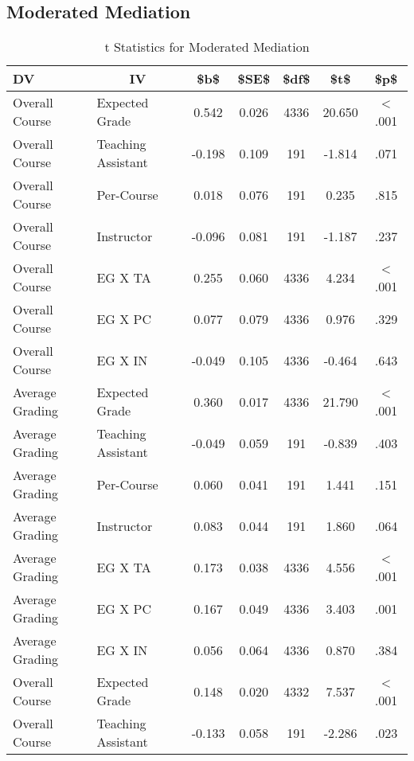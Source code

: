 \documentclass[man]{apa6}
\theoremstyle{definition}
\theoremstyle{definition}
\theoremstyle{definition}
\theoremstyle{remark}
\begin{document}
\hypertarget{moderated-mediation}{%
\subsection{Moderated Mediation}\label{moderated-mediation}}

\begin{table}[tbp]
\begin{center}
\begin{threeparttable}
\caption{\label{tab:table-mod-med}t Statistics for Moderated Mediation}
\begin{tabular}{llccccc}
\toprule
DV & \multicolumn{1}{c}{IV} & \multicolumn{1}{c}{\$b\$} & \multicolumn{1}{c}{\$SE\$} & \multicolumn{1}{c}{\$df\$} & \multicolumn{1}{c}{\$t\$} & \multicolumn{1}{c}{\$p\$}\\
\midrule
Overall Course & Expected Grade & 0.542 & 0.026 & 4336 & 20.650 & < .001\\
Overall Course & Teaching Assistant & -0.198 & 0.109 & 191 & -1.814 & .071\\
Overall Course & Per-Course & 0.018 & 0.076 & 191 & 0.235 & .815\\
Overall Course & Instructor & -0.096 & 0.081 & 191 & -1.187 & .237\\
Overall Course & EG X TA & 0.255 & 0.060 & 4336 & 4.234 & < .001\\
Overall Course & EG X PC & 0.077 & 0.079 & 4336 & 0.976 & .329\\
Overall Course & EG X IN & -0.049 & 0.105 & 4336 & -0.464 & .643\\
Average Grading & Expected Grade & 0.360 & 0.017 & 4336 & 21.790 & < .001\\
Average Grading & Teaching Assistant & -0.049 & 0.059 & 191 & -0.839 & .403\\
Average Grading & Per-Course & 0.060 & 0.041 & 191 & 1.441 & .151\\
Average Grading & Instructor & 0.083 & 0.044 & 191 & 1.860 & .064\\
Average Grading & EG X TA & 0.173 & 0.038 & 4336 & 4.556 & < .001\\
Average Grading & EG X PC & 0.167 & 0.049 & 4336 & 3.403 & .001\\
Average Grading & EG X IN & 0.056 & 0.064 & 4336 & 0.870 & .384\\
Overall Course & Expected Grade & 0.148 & 0.020 & 4332 & 7.537 & < .001\\
Overall Course & Teaching Assistant & -0.133 & 0.058 & 191 & -2.286 & .023\\

\end{tabular}
\end{threeparttable}
\end{center}
\end{table}
\end{document}
